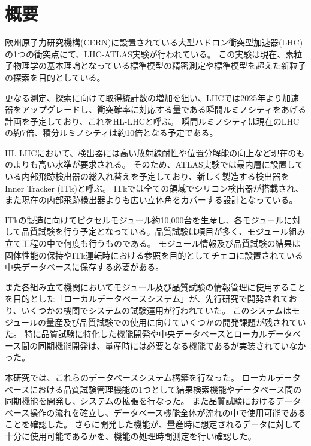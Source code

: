 \chapter*{概要}

欧州原子力研究機構(CERN)に設置されている大型ハドロン衝突型加速器(LHC)の1つの衝突点にて、LHC-ATLAS実験が行われている。
この実験は現在、素粒子物理学の基本理論となっている標準模型の精密測定や標準模型を超えた新粒子の探索を目的としている。

更なる測定、探索に向けて取得統計数の増加を狙い、LHCでは2025年より加速器をアップグレードし、衝突確率に対応する量である瞬間ルミノシティをあげる計画を予定しており、これをHL-LHCと呼ぶ。
瞬間ルミノシティは現在のLHCの約7倍、積分ルミノシティは約10倍となる予定である。

HL-LHCにおいて、検出器には高い放射線耐性や位置分解能の向上など現在のものよりも高い水準が要求される。
そのため、ATLAS実験では最内層に設置している内部飛跡検出器の総入れ替えを予定しており、新しく製造する検出器をInner Tracker (ITk)と呼ぶ。
ITkでは全ての領域でシリコン検出器が搭載され、また現在の内部飛跡検出器よりも広い立体角をカバーする設計となっている。

ITkの製造に向けてピクセルモジュール約10,000台を生産し、各モジュールに対して品質試験を行う予定となっている。品質試験は項目が多く、モジュール組み立て工程の中で何度も行うものである。
モジュール情報及び品質試験の結果は固体性能の保持やITk運転時における参照を目的としてチェコに設置されている中央データベースに保存する必要がある。

また各組み立て機関においてモジュール及び品質試験の情報管理に使用することを目的とした「ローカルデータベースシステム」が、先行研究で開発されており、いくつかの機関でシステムの試験運用が行われていた。
このシステムはモジュールの量産及び品質試験での使用に向けていくつかの開発課題が残されていた。
特に品質試験に特化した機能開発や中央データベースとローカルデータベース間の同期機能開発は、量産時には必要となる機能であるが実装されていなかった。

本研究では、これらのデータベースシステム構築を行なった。
ローカルデータベースにおける品質試験管理機能の1つとして結果検索機能やデータベース間の同期機能を開発し、システムの拡張を行なった。
また品質試験におけるデータベース操作の流れを確立し、データベース機能全体が流れの中で使用可能であることを確認した。
さらに開発した機能が、量産時に想定されるデータに対して十分に使用可能であるかを、機能の処理時間測定を行い確認した。


